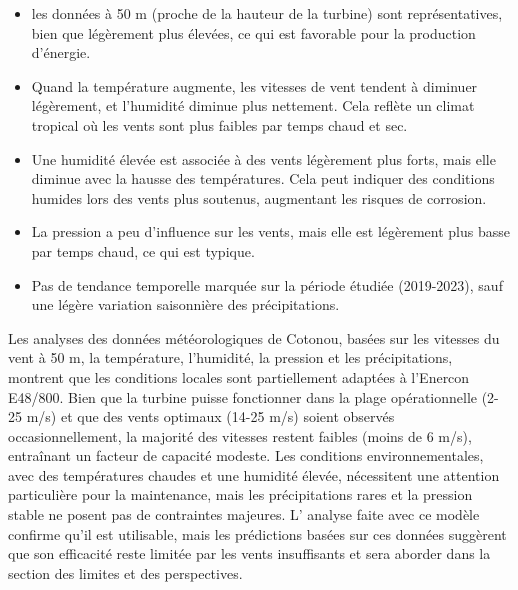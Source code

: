 \documentclass[12pt]{article}
\begin{document}
\begin{itemize}[label=$\color{blue}\diamond$]
\begin{itemize}
		\item les données à 50 m (proche de la hauteur de la turbine) sont représentatives, bien que légèrement plus élevées, ce qui est favorable pour la production d'énergie.
		\item Quand la température augmente, les vitesses de vent tendent à diminuer légèrement, et l'humidité diminue plus nettement. Cela reflète un climat tropical où les vents sont plus faibles par temps chaud et sec.
		\item Une humidité élevée est associée à des vents légèrement plus forts, mais elle diminue avec la hausse des températures. Cela peut indiquer des conditions humides lors des vents plus soutenus, augmentant les risques de corrosion.
		\item La pression a peu d'influence sur les vents, mais elle est légèrement plus basse par temps chaud, ce qui est typique.
		\item Pas de tendance temporelle marquée sur la période étudiée (2019-2023), sauf une légère variation saisonnière des précipitations.
	\end{itemize}
	Les analyses des données météorologiques de Cotonou, basées sur les vitesses du vent à 50 m, la température, l'humidité, la pression et les précipitations, montrent que les conditions locales sont partiellement adaptées à l'Enercon E48/800. Bien que la turbine puisse fonctionner dans la plage opérationnelle (2-25 m/s) et que des vents optimaux (14-25 m/s) soient observés occasionnellement, la majorité des vitesses restent faibles (moins de 6 m/s), entraînant un facteur de capacité modeste. Les conditions environnementales, avec des températures chaudes et une humidité élevée, nécessitent une attention particulière pour la maintenance, mais les précipitations rares et la pression stable ne posent pas de contraintes majeures. L' analyse faite avec ce modèle confirme qu'il est utilisable, mais les prédictions basées sur ces données suggèrent que son efficacité reste limitée par les vents insuffisants et sera aborder dans la section des limites et des perspectives.
\end{itemize}
\end{document}
